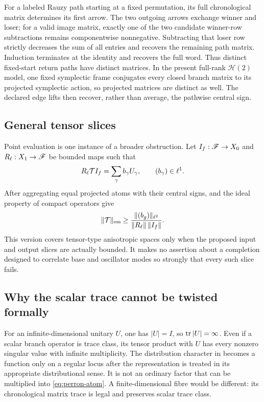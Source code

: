 For a labeled Rauzy path starting at a fixed permutation, its full
chronological matrix determines its first arrow.  The two outgoing arrows
exchange winner and loser; for a valid image matrix, exactly one of the two
candidate winner-row subtractions remains componentwise nonnegative.
Subtracting that loser row strictly decreases the sum of all entries and
recovers the remaining path matrix.  Induction terminates at the identity
and recovers the full word.  Thus distinct fixed-start return paths have
distinct matrices.  In the present full-rank \(\mathcal H(2)\) model, one
fixed symplectic frame conjugates every closed branch matrix to its projected
symplectic action, so projected matrices are distinct as well.  The declared
edge lifts then recover, rather than average, the pathwise central sign.

\subsection{General tensor slices}

Point evaluation is one instance of a broader obstruction.  Let
\(I_f:\mathscr{F}\to X_0\) and \(R_\ell:X_1\to\mathscr{F}\) be bounded maps such that
\[
 R_\ell\mathcal{T} I_f=\sum_\gamma b_\gamma U_\gamma,
 \qquad (b_\gamma)\in\ell^1.
\]
After aggregating equal projected atoms with their central signs,
 and the ideal property of compact operators give
\[
 \|\mathcal{T}\|_{\mathrm{ess}}
 \geq
 \frac{\|(b_g)\|_{\ell^2}}
 {\|R_\ell\|\,\|I_f\|}.
\]
This version covers tensor-type anisotropic spaces only when the proposed
input and output slices are actually bounded.  It makes no assertion about
a completion designed to correlate base and oscillator modes so strongly
that every such slice fails.

\subsection{Why the scalar trace cannot be twisted formally}

For an infinite-dimensional unitary \(U\), one has \(|U|=I\), so
\(\operatorname{tr}|U|=\infty\).  Even if a scalar branch operator is trace class, its
tensor product with \(U\) has every nonzero singular value with infinite
multiplicity.  The distribution character in \citet{thomas2008} becomes a
function only on a regular locus after the representation is treated in its
appropriate distributional sense.  It is not an ordinary factor that can
be multiplied into \eqref{eq:perron-atom}.  A finite-dimensional fibre would
be different: its chronological matrix trace is legal and preserves scalar
trace class.
